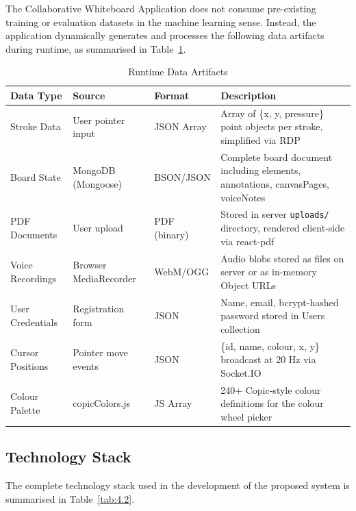 \documentclass[12pt,a4paper]{report}
\begin{document}
The Collaborative Whiteboard Application does not consume pre-existing training or evaluation datasets in the machine learning sense. Instead, the application dynamically generates and processes the following data artifacts during runtime, as summarised in Table~\ref{tab:4.1}.

\begin{table}[htbp]
  \caption{Runtime Data Artifacts}
  \label{tab:4.1}
  \centering
  \begin{tabular}{@{} p{3cm} p{3cm} p{3cm} p{4cm} @{}}
    \toprule
    \textbf{Data Type} & \textbf{Source} & \textbf{Format} & \textbf{Description} \\
    \midrule
    Stroke Data       & User pointer input    & JSON Array  & Array of \{x, y, pressure\} point objects per stroke, simplified via RDP \\
    Board State       & MongoDB (Mongoose)    & BSON/JSON   & Complete board document including elements, annotations, canvasPages, voiceNotes \\
    PDF Documents     & User upload           & PDF (binary) & Stored in server \texttt{uploads/} directory, rendered client-side via react-pdf \\
    Voice Recordings  & Browser MediaRecorder & WebM/OGG    & Audio blobs stored as files on server or as in-memory Object URLs \\
    User Credentials  & Registration form     & JSON        & Name, email, bcrypt-hashed password stored in Users collection \\
    Cursor Positions  & Pointer move events   & JSON        & \{id, name, colour, x, y\} broadcast at 20 Hz via Socket.IO \\
    Colour Palette    & copicColors.js        & JS Array    & 240+ Copic-style colour definitions for the colour wheel picker \\
    \bottomrule
  \end{tabular}
\end{table}

\subsection{Technology Stack}

The complete technology stack used in the development of the proposed system is summarised in Table~\ref{tab:4.2}.
\end{document}
